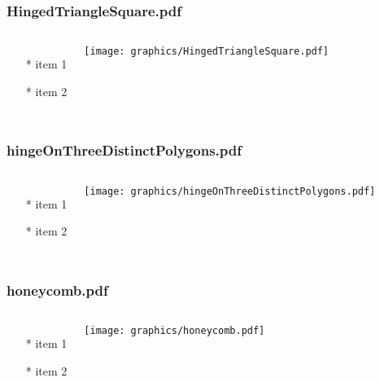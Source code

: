 \documentclass{beamer}
\begin{document}
\begin{frame} \frametitle{HingedTriangleSquare.pdf}
    \begin{columns}[c]
        \begin{itemize}
            \item[*] item 1
            \item[*] item 2
        \end{itemize}
        \begin{minipage}{\linewidth}
            \begin{center}
            \texttt{[image: graphics/HingedTriangleSquare.pdf]}
            \label{gfx:HingedTriangleSquare.pdf}
            \end{center}
        \end{minipage}
    \end{columns}
\end{frame}
\begin{frame} \frametitle{hingeOnThreeDistinctPolygons.pdf}
    \begin{columns}[c]
        \begin{itemize}
            \item[*] item 1
            \item[*] item 2
        \end{itemize}
        \begin{minipage}{\linewidth}
            \begin{center}
            \texttt{[image: graphics/hingeOnThreeDistinctPolygons.pdf]}
            \label{gfx:hingeOnThreeDistinctPolygons.pdf}
            \end{center}
        \end{minipage}
    \end{columns}
\end{frame}
\begin{frame} \frametitle{honeycomb.pdf}
    \begin{columns}[c]
        \begin{itemize}
            \item[*] item 1
            \item[*] item 2
        \end{itemize}
        \begin{minipage}{\linewidth}
            \begin{center}
            \texttt{[image: graphics/honeycomb.pdf]}
            \label{gfx:honeycomb.pdf}
            \end{center}
        \end{minipage}
    \end{columns}
\end{frame}
\end{document}
